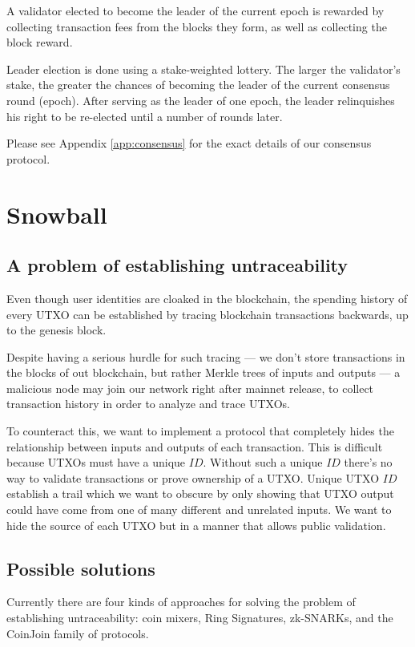 \documentclass[8pt,fleqn,openany]{book}
\begin{document}
A validator elected to become the leader of the current epoch is rewarded by collecting transaction fees from the blocks they form, as well as collecting the block reward. 

Leader election is done using a stake-weighted lottery. The larger the validator's stake, the greater the chances of becoming the leader of the current consensus round (epoch). After serving as the leader of one epoch, the leader relinquishes his right to be re-elected until a number of rounds later.

Please see Appendix \ref{app:consensus} for the exact details of our consensus protocol.

\section{Snowball}

\subsection{A problem of establishing untraceability}
Even though user identities are cloaked in the blockchain, the spending history of every UTXO can be established by tracing blockchain transactions backwards, up to the genesis block.

Despite having a serious hurdle for such tracing --- we don't store transactions in the blocks of out blockchain, but rather Merkle trees of inputs and outputs --- a malicious node may join our network right after mainnet release, to collect transaction history in order to analyze and trace UTXOs.

To counteract this, we want to implement a protocol that completely hides the relationship between inputs and outputs of each transaction. This is difficult because UTXOs must have a unique $ID$. Without such a unique $ID$ there's no way to validate transactions or prove ownership of a UTXO. Unique UTXO $ID$ establish a trail which we want to obscure by only showing that UTXO output could have come from one of many different and unrelated inputs. We want to hide the source of each UTXO but in a manner that allows public validation.

\subsection{Possible solutions}
Currently there are four kinds of approaches for solving the problem of establishing untraceability: coin mixers, Ring Signatures, zk-SNARKs, and the CoinJoin family of protocols.
\end{document}
